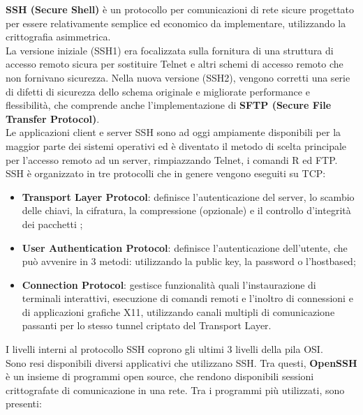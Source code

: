         \textbf{SSH (Secure Shell)} è un protocollo per comunicazioni di rete sicure progettato per essere
        relativamente semplice ed economico da implementare, utilizzando la crittografia asimmetrica.\\

        La versione iniziale (SSH1) era focalizzata sulla fornitura di una struttura di accesso remoto
        sicura per sostituire Telnet e altri schemi di accesso remoto che non fornivano sicurezza. Nella
        nuova versione (SSH2), vengono corretti una serie di difetti di sicurezza dello schema originale
        e migliorate performance e flessibilità, che comprende anche l’implementazione di \textbf{SFTP
        (Secure File Transfer Protocol)}.\\

        Le applicazioni client e server SSH sono ad oggi ampiamente disponibili per la maggior parte
        dei sistemi operativi ed è diventato il metodo di scelta principale per l'accesso remoto ad un
        server, rimpiazzando Telnet, i comandi R ed FTP.\\

        SSH è organizzato in tre protocolli che in genere vengono eseguiti su TCP:

        \begin{itemize}
            \item \textbf{Transport Layer Protocol}: definisce l'autenticazione del server, lo scambio delle chiavi,
            la cifratura, la compressione (opzionale) e il controllo d'integrità dei pacchetti ;
            \item \textbf{User Authentication Protocol}: definisce l'autenticazione dell'utente, che può avvenire
            in 3 metodi: utilizzando la public key, la password o l'hostbased;
            \item \textbf{Connection Protocol}: gestisce funzionalità quali l'instaurazione di terminali interattivi,
            esecuzione di comandi remoti e l’inoltro di connessioni e di applicazioni grafiche X11,
            utilizzando canali multipli di comunicazione passanti per lo stesso tunnel criptato del
            Transport Layer.
        \end{itemize}

        I livelli interni al protocollo SSH coprono gli ultimi 3 livelli della pila OSI.\\

        Sono resi disponibili diversi applicativi che utilizzano SSH. Tra questi, \textbf{OpenSSH} è un
        insieme di programmi open source, che rendono disponibili sessioni crittografate di
        comunicazione in una rete. Tra i programmi più utilizzati, sono presenti:

